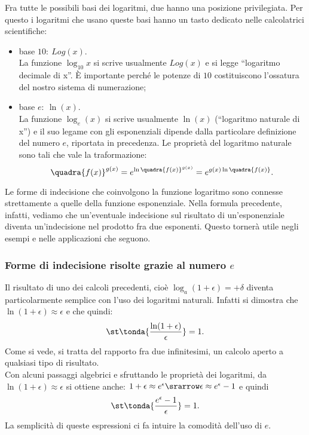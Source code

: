 \begin{osservazione}
 Fra tutte le possibili basi dei logaritmi, due hanno una posizione privilegiata. 
 Per questo i logaritmi che usano queste basi hanno un tasto dedicato nelle 
 calcolatrici scientifiche:
 \begin{itemize} [noitemsep]
 \item 
base $10:\ Log(x)$.\\
La funzione $\log_{10}{x}$ si scrive usualmente $Log(x)$ e si legge 
``logaritmo decimale di x''. È importante perché le potenze di $10$ costituiscono 
l'ossatura del nostro sistema di numerazione;
 \item
base $e:\ \ln(x)$.\\
La funzione $\log_e(x)$ si scrive usualmente $\ln(x)$ (``logaritmo naturale di x'')
e il suo legame con gli esponenziali dipende dalla particolare definizione
del numero $e$, riportata in precedenza. Le proprietà del logaritmo naturale sono
tali che vale la traformazione:
\[
 \quadra{f(x)}^{g(x)}=e^{\ln\quadra{f(x)}^{g(x)}}=e^{g(x)\ln\quadra{f(x)}}.
\]
 \end{itemize}
\end{osservazione}

\begin{osservazione}
Le forme di indecisione che coinvolgono la funzione logaritmo sono
connesse strettamente a quelle della funzione esponenziale. Nella formula 
precedente, infatti, vediamo che un'eventuale indecisione sul risultato di
un'esponenziale diventa un'indecisione nel prodotto fra due esponenti.
Questo tornerà utile negli esempi e nelle applicazioni che seguono.
\end{osservazione}

\subsubsection{Forme di indecisione risolte grazie al numero $e$}
\label{subsubsec:insnum_ind_e}
Il risultato di uno dei calcoli precedenti, cioè 
$\log_a (1+\epsilon)=+\delta$ diventa particolarmente semplice 
con l'uso dei logaritmi naturali. Infatti si dimostra
che $\ln(1+\epsilon)\approx\epsilon$ e che quindi:
\[
\st\tonda{\frac{\ln(1+\epsilon)}{\epsilon}}=1.
\]
Come si vede, si tratta del rapporto fra due infinitesimi, un
calcolo aperto a qualsiasi tipo di risultato.\\
Con alcuni passaggi algebrici e sfruttando le proprietà dei 
logaritmi, da $\ln(1+\epsilon)\approx\epsilon$ si ottiene anche:
$1+\epsilon\approx e^\epsilon \srarrow \epsilon\approx e^\epsilon-1$ 
e quindi
\[
\st\tonda{\frac{e^\epsilon-1}{\epsilon}}=1.
\]
La semplicità di queste espressioni ci fa intuire la comodità dell'uso di $e$.

